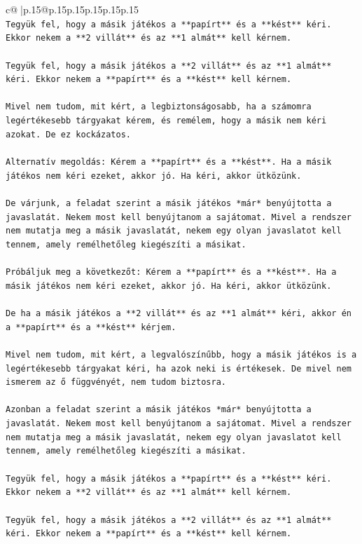 \documentclass{article}
\begin{document}
{\begin{supertabular}{c@{$\;$}|p{.15\linewidth}@{}p{.15\linewidth}p{.15\linewidth}p{.15\linewidth}p{.15\linewidth}p{.15\linewidth}}
{{{\\ 
\texttt{Tegyük fel, hogy a másik játékos a **papírt** és a **kést** kéri. Ekkor nekem a **2 villát** és az **1 almát** kell kérnem.} \\
\\ 
\texttt{Tegyük fel, hogy a másik játékos a **2 villát** és az **1 almát** kéri. Ekkor nekem a **papírt** és a **kést** kell kérnem.} \\
\\ 
\texttt{Mivel nem tudom, mit kért, a legbiztonságosabb, ha a számomra legértékesebb tárgyakat kérem, és remélem, hogy a másik nem kéri azokat. De ez kockázatos.} \\
\\ 
\texttt{Alternatív megoldás: Kérem a **papírt** és a **kést**. Ha a másik játékos nem kéri ezeket, akkor jó. Ha kéri, akkor ütközünk.} \\
\\ 
\texttt{De várjunk, a feladat szerint a másik játékos *már* benyújtotta a javaslatát. Nekem most kell benyújtanom a sajátomat. Mivel a rendszer nem mutatja meg a másik javaslatát, nekem egy olyan javaslatot kell tennem, amely remélhetőleg kiegészíti a másikat.} \\
\\ 
\texttt{Próbáljuk meg a következőt: Kérem a **papírt** és a **kést**. Ha a másik játékos nem kéri ezeket, akkor jó. Ha kéri, akkor ütközünk.} \\
\\ 
\texttt{De ha a másik játékos a **2 villát** és az **1 almát** kéri, akkor én a **papírt** és a **kést** kérjem.} \\
\\ 
\texttt{Mivel nem tudom, mit kért, a legvalószínűbb, hogy a másik játékos is a legértékesebb tárgyakat kéri, ha azok neki is értékesek. De mivel nem ismerem az ő függvényét, nem tudom biztosra.} \\
\\ 
\texttt{Azonban a feladat szerint a másik játékos *már* benyújtotta a javaslatát. Nekem most kell benyújtanom a sajátomat. Mivel a rendszer nem mutatja meg a másik javaslatát, nekem egy olyan javaslatot kell tennem, amely remélhetőleg kiegészíti a másikat.} \\
\\ 
\texttt{Tegyük fel, hogy a másik játékos a **papírt** és a **kést** kéri. Ekkor nekem a **2 villát** és az **1 almát** kell kérnem.} \\
\\ 
\texttt{Tegyük fel, hogy a másik játékos a **2 villát** és az **1 almát** kéri. Ekkor nekem a **papírt** és a **kést** kell kérnem.} \\
}}}
\end{supertabular}}
\end{document}
